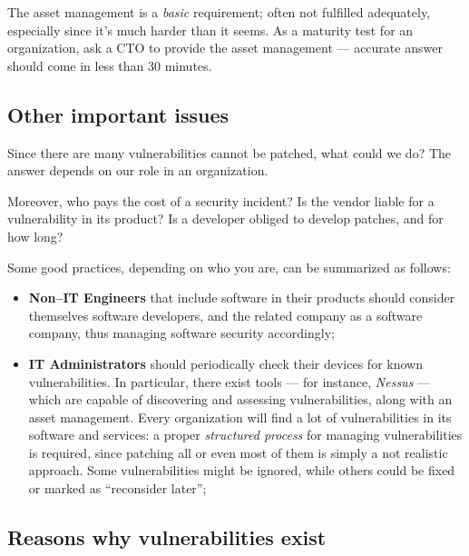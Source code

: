 \documentclass[10pt]{\classname}
\begin{document}
The asset management is a \emph{basic} requirement; often not fulfilled
adequately, especially since it's much harder than it seems. As a maturity test
for an organization, ask a CTO to provide the asset management --- accurate
answer should come in less than 30 minutes.

\subsection{Other important issues}

Since there are many vulnerabilities cannot be patched, what could we do? The
answer depends on our role in an organization.

Moreover, who pays the cost of a security incident? Is the vendor liable for a
vulnerability in its product? Is a developer obliged to develop patches, and
for how long?

Some good practices, depending on who you are, can be summarized as follows:

\begin{itemize}
    \item \textbf{Non--IT Engineers} that include software in their products
        should consider themselves software developers, and the related company
        as a software company, thus managing software security accordingly;
    \item \textbf{IT Administrators} should periodically check their devices
        for known vulnerabilities. In particular, there exist tools --- for
        instance, \emph{Nessus} --- which are capable of discovering and
        assessing vulnerabilities, along with an asset management. Every
        organization will find a lot of vulnerabilities in its software and
        services: a proper \emph{structured process} for managing
        vulnerabilities is required, since patching all or even most of them is
        simply a not realistic approach. Some vulnerabilities might be ignored,
        while others could be fixed or marked as ``reconsider later'';
\end{itemize}


\subsection{Reasons why vulnerabilities exist}
\end{document}
